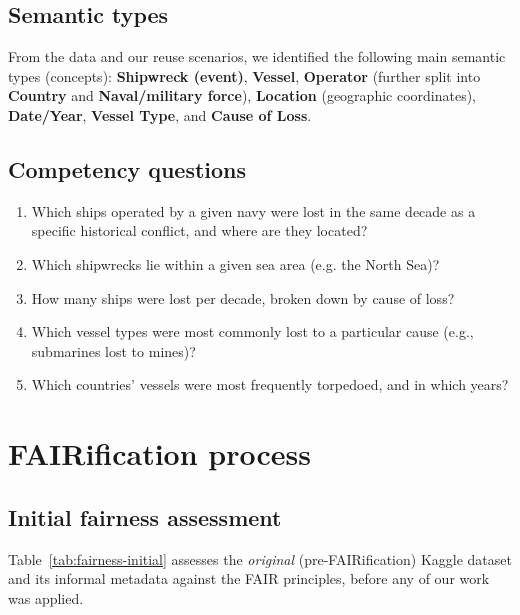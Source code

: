 \subsection{Semantic types}
From the data and our reuse scenarios, we identified the following main semantic types (concepts): \textbf{Shipwreck (event)}, \textbf{Vessel}, \textbf{Operator} (further split into \textbf{Country} and \textbf{Naval/military force}), \textbf{Location} (geographic coordinates), \textbf{Date/Year}, \textbf{Vessel Type}, and \textbf{Cause of Loss}.

\subsection{Competency questions}
\begin{enumerate}
    \item Which ships operated by a given navy were lost in the same decade as a specific historical conflict, and where are they located?
    \item Which shipwrecks lie within a given sea area (e.g. the North Sea)?
    \item How many ships were lost per decade, broken down by cause of loss?
    \item Which vessel types were most commonly lost to a particular cause (e.g., submarines lost to mines)?
    \item Which countries' vessels were most frequently torpedoed, and in which years?
\end{enumerate}

\section{FAIRification process}

\subsection{Initial fairness assessment}

Table~\ref{tab:fairness-initial} assesses the \emph{original} (pre-FAIRification) Kaggle dataset and its informal metadata against the FAIR principles, before any of our work was applied.

